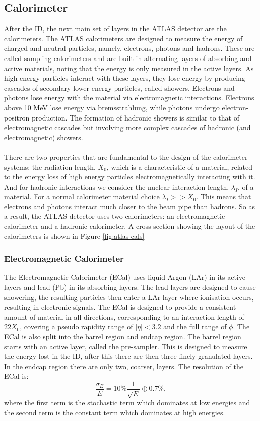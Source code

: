 \subsection{Calorimeter}
After the ID, the next main set of layers in the ATLAS detector are the calorimeters. The ATLAS calorimeters \cite{atlas_cals} are designed to measure the energy of charged and neutral particles, namely, electrons, photons and hadrons. These are called sampling calorimeters and are built in alternating layers of absorbing and active materials, noting that the energy is only measured in the active layers. As high energy particles interact with these layers, they lose energy by producing cascades of secondary lower-energy particles, called showers. Electrons and photons lose energy with the material via electromagnetic interactions. Electrons above 10 MeV lose energy via bremsstrahlung, while photons undergo electron-positron production. The formation of hadronic showers is similar to that of electromagnetic cascades but involving more complex cascades of hadronic
(and electromagnetic) showers. 
\\
\\
There are two properties that are fundamental to the design of the calorimeter systems: the radiation length, $X_0$, which is a characteristic of a material, related to the energy loss of high energy particles electromagnetically interacting with it. And for hadronic interactions we consider the nuclear interaction length, $\lambda_I$, of a material. For a normal calorimeter material choice $\lambda_I >> X_0$. This means that electrons and photons interact much closer to the beam pipe than hadrons. So as a result, the ATLAS detector uses two calorimeters: an electromagnetic calorimeter and a hadronic calorimeter. A cross section showing the layout of the calorimeters is shown in Figure \ref{fig:atlas-cals}

\subsubsection{Electromagnetic Calorimeter}
The Electromagnetic Calorimeter (ECal) \cite{ecal} uses liquid Argon (LAr) in its active layers and lead (Pb) in its absorbing layers. The lead layers are designed to cause showering, the resulting particles then enter a LAr layer where ionisation occurs, resulting in electronic signals. The ECal is designed to provide a consistent amount of material in all directions, corresponding to an interaction length of $22X_0$, covering a pseudo rapidity range of $|\eta| < 3.2$ and the full range of $\phi$. The ECal is also split into the barrel region and endcap region. The barrel region starts with an active layer, called the pre-sampler. This is designed to measure the energy lost in the ID, after this there are then three finely granulated layers. In the endcap region there are only two, coarser, layers. The resolution of the ECal is:
\begin{equation}
    \frac{\sigma_E}{E}=10\%\frac{1}{\sqrt{E}}\oplus 0.7\%,
\end{equation}
where the first term is the stochastic term which dominates at low energies and the second term is the constant term which dominates at high energies.
